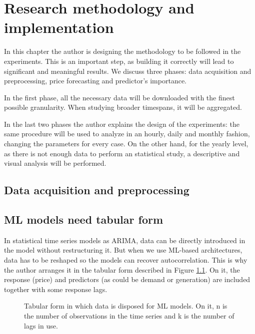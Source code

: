 \chapter{Research methodology and implementation}
In this chapter the author is designing the methodology to be followed in the experiments. This is an important step, as building it correctly will lead to significant and meaningful results.
We discuss three phases: data acquisition and preprocessing, price forecasting and predictor's importance.

In the first phase, all the necessary data will be downloaded with the finest possible granularity.
When studying broader timespans, it will be aggregated.

In the last two phases the author explains the design of the experiments: the same procedure will be used to analyze in an hourly, daily and monthly fashion, changing the parameters for every case.
On the other hand, for the yearly level, as there is not enough data to perform an statistical study, a descriptive and visual analysis will be performed.

\section{Data acquisition and preprocessing}

\section{ML models need tabular form}
In statistical time series models as ARIMA, data can be directly introduced in the model without restructuring it.
But when we use ML-based architectures, data has to be reshaped so the models can recover autocorrelation.
This is why the author arranges it in the tabular form described in Figure \ref{fig:ml-arrangement}.
On it, the response (price) and predictors (as could be demand or generation) are included together with some response lags.

\begin{figure}[H]
\centering
    \caption{Tabular form in which data is disposed for ML models. On it, n is the number of observations in the time series and k is the number of lags in use.}
    \label{fig:ml-arrangement}
\end{figure}

